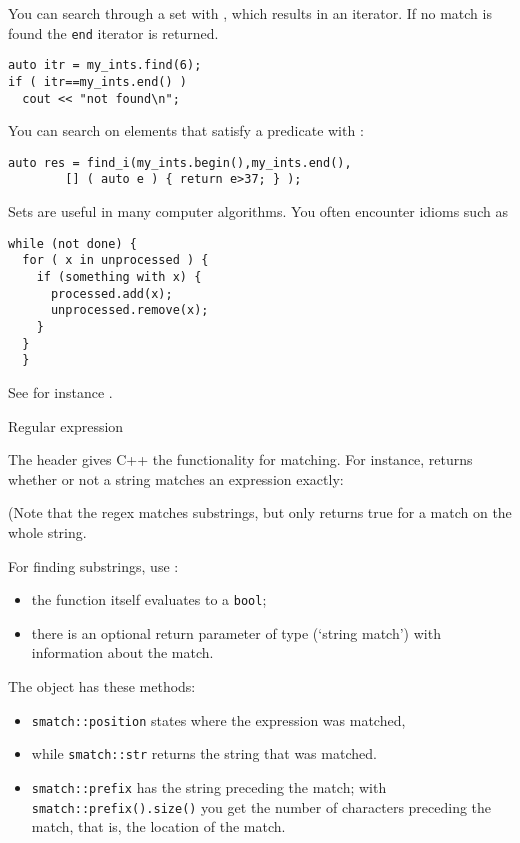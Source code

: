 You can search through a set with ,
which results in an iterator.
If no match is found the \lstinline{end} iterator
is returned.
\begin{lstlisting}
auto itr = my_ints.find(6);
if ( itr==my_ints.end() )
  cout << "not found\n";
\end{lstlisting}
You can search on elements that satisfy a predicate
with :
\begin{lstlisting}
auto res = find_i(my_ints.begin(),my_ints.end(),
        [] ( auto e ) { return e>37; } );
\end{lstlisting}

Sets are useful in many computer algorithms.
You often encounter idioms such as
\begin{lstlisting}
while (not done) {
  for ( x in unprocessed ) {
    if (something with x) {
      processed.add(x);
      unprocessed.remove(x);
    }
  }
  }
\end{lstlisting}
See for instance .

 {Regular expression}

The header  gives C++ the functionality for
 matching. For instance,
 returns whether or not
a string matches an expression exactly:


(Note that the regex matches substrings, but
 only returns true for
a match on the whole string.

For finding substrings, use :
\begin{itemize}
\item the function itself evaluates to a \lstinline{bool};
\item there is an optional return parameter of type 
  (`string match') with information about the match.
\end{itemize}
The  object has these methods:
\begin{itemize}
\item \lstinline{smatch::position} states where the expression
  was matched,
\item while \lstinline{smatch::str} returns the string that
  was matched.
\item \lstinline{smatch::prefix} has the string preceding the match;
  with \lstinline{smatch::prefix().size()} you get the number of characters
  preceding the match, that is, the location of the match.
\end{itemize}

